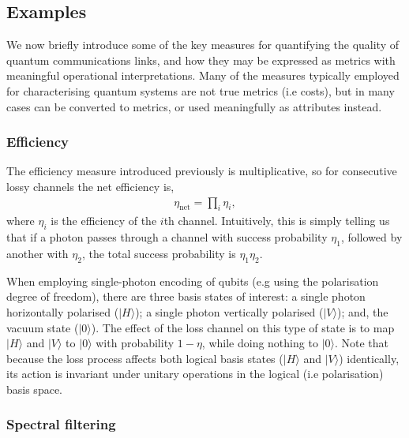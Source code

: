 \documentclass[aps, rmp, twocolumn, amsmath, amssymb, nofootinbib, superscriptaddress, longbibliography, floatfix, table-of-contents, eqsecnum]{revtex4-1}
\newcommand{\ket}[1]{|#1\rangle}
\begin{document}
%
%

\subsection{Examples}

We now briefly introduce some of the key measures for quantifying the quality of quantum communications links, and how they may be expressed as metrics with meaningful operational interpretations. Many of the measures typically employed for characterising quantum systems are not true metrics (i.e costs), but in many cases can be converted to metrics, or used meaningfully as attributes instead.

%
%

\subsubsection{Efficiency} 

The efficiency measure introduced previously is multiplicative, so for consecutive lossy channels the net efficiency is,
\begin{align}
\eta_\text{net}=\prod_i \eta_i,
\end{align}
where $\eta_i$ is the efficiency of the $i$th channel. Intuitively, this is simply telling us that if a photon passes through a channel with success probability $\eta_1$, followed by another with $\eta_2$, the total success probability is \mbox{$\eta_1\eta_2$}.

When employing single-photon encoding of qubits (e.g using the polarisation degree of freedom), there are three basis states of interest: a single photon horizontally polarised ($\ket{H}$); a single photon vertically polarised ($\ket{V}$); and, the vacuum state ($\ket{0}$). The effect of the loss channel on this type of state is to map $\ket{H}$ and $\ket{V}$ to $\ket{\text{0}}$ with probability \mbox{$1-\eta$}, while doing nothing to $\ket{\text{0}}$. Note that because the loss process affects both logical basis states ($\ket{H}$ and $\ket{V}$) identically, its action is invariant under unitary operations in the logical (i.e polarisation) basis space.

%
%

\subsubsection{Spectral filtering} 
\end{document}
